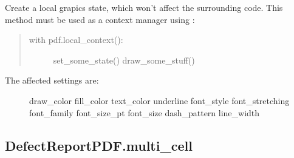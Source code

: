\documentclass[letterpaper,10pt,english]{sphinxmanual}
\begin{document}
\begin{fulllineitems}
\begin{fulllineitems}
\label{\detokenize{generated/quality_assessment.quality_pdf_report.DefectReportPDF.local_context:quality_assessment.quality_pdf_report.DefectReportPDF.local_context}}
\sphinxAtStartPar
Create a local grapics state, which won’t affect the surrounding code.
This method must be used as a context manager using :
\begin{quote}
\begin{description}
\item[{with pdf.local\_context():}] \leavevmode
\sphinxAtStartPar
set\_some\_state()
draw\_some\_stuff()

\end{description}
\end{quote}
\begin{description}
\item[{The affected settings are:}] \leavevmode
\sphinxAtStartPar
draw\_color
fill\_color
text\_color
underline
font\_style
font\_stretching
font\_family
font\_size\_pt
font\_size
dash\_pattern
line\_width

\end{description}

\end{fulllineitems}



\subsection{DefectReportPDF.multi\_cell}
\label{\detokenize{generated/quality_assessment.quality_pdf_report.DefectReportPDF.multi_cell:defectreportpdf-multi-cell}}\label{\detokenize{generated/quality_assessment.quality_pdf_report.DefectReportPDF.multi_cell::doc}}


\end{fulllineitems}
\end{document}
